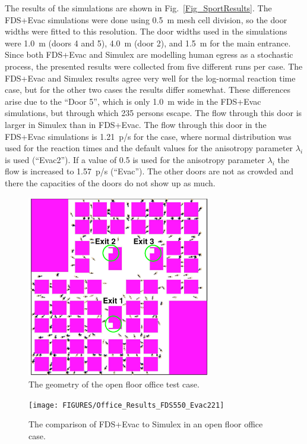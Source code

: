 \documentclass[12pt,a4paper,final,twoside]{stylevk}
\begin{document}
\begin{enumerate}
  
  The results of the simulations are shown in
  Fig.~\ref{Fig_SportResults}.  The FDS+Evac simulations were done
  using 0.5~m mesh cell division, so the door widths were fitted to
  this resolution.  The door widths used in the simulations were 1.0~m
  (doors 4 and 5), 4.0~m (door 2), and 1.5~m for the main entrance.
  Since both FDS+Evac and Simulex are modelling human egress as a
  stochastic process, the presented results were collected from five
  different runs per case.  The FDS+Evac and Simulex results agree
  very well for the log-normal reaction time case, but for the other
  two cases the results differ somewhat.  These differences arise due
  to the ``Door 5'', which is only 1.0~m wide in the FDS+Evac
  simulations, but through which 235 persons escape.  The flow through
  this door is larger in Simulex than in FDS+Evac.  The flow through
  this door in the FDS+Evac simulations is 1.21~p/s for the case,
  where normal distribution was used for the reaction times and the
  default values for the anisotropy parameter $\lambda_i$ is used
  (``Evac2'').  If a value of 0.5 is used for the anisotropy parameter
  $\lambda_i$ the flow is increased to 1.57~p/s (``Evac'').  The other
  doors are not as crowded and there the capacities of the doors do
  not show up as much.

%
\begin{figure}[!tb]
  \centerline{\includegraphics[clip=true,
  width=80mm]{FIGURES/OpenFloorGeom}} 
  \caption{The geometry of the open floor office test
    case.}\label{Fig_OpenFloorGeom}
\end{figure}
%

%
\begin{figure}[!b]
  \centerline{\texttt{[image: FIGURES/Office\_Results\_FDS550\_Evac221]}} 
  \caption{The comparison of FDS+Evac to Simulex in an open floor
    office case.}\label{Fig_OpenFloorResults} 
\end{figure}
%


\end{enumerate}
\end{document}
